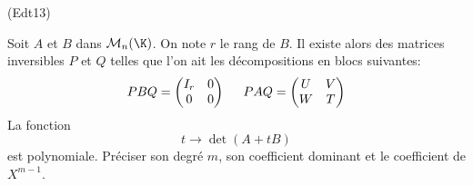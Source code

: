 \begin{tiny}(Edt13)\end{tiny} Soit $A$ et $B$ dans $\mathcal{M}_n(\K)$. On note $r$ le rang de $B$. Il existe alors des matrices inversibles $P$ et $Q$ telles que l'on ait les décompositions en blocs suivantes:
\begin{displaymath}
 PBQ =
\begin{pmatrix}
 I_r & 0 \\ 0&0
\end{pmatrix}
\hspace{0,5cm}
 PAQ =
\begin{pmatrix}
 U & V \\ W & T
\end{pmatrix}
\end{displaymath}
La fonction
\begin{displaymath}
 t\rightarrow \det(A+tB)
\end{displaymath}
est polynomiale. Préciser son degré $m$, son coefficient dominant et le coefficient de $X^{m-1}$.